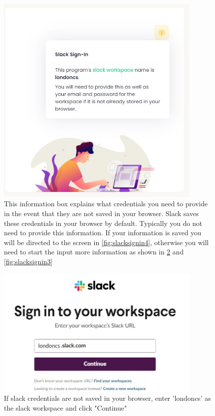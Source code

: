 \begin{figure}[H]
    \centering
    \includegraphics[width=10cm]{images/user-guide/slack-sign-in/1a.jpg}
    \caption{This information box explains what credentials you need to provide in the event that they are not saved in your browser. Slack saves these credentials in your browser by default. Typically you do not need to provide this information. If your information is saved you will be directed to the screen in \cref{fig:slacksignin4}, otherwise you will need to start the input more information as shown in \cref{fig:slacksignin2} and \cref{fig:slacksignin3}}
    \label{fig:slacksignin1a}
\end{figure}
\begin{figure}[H]
    \centering
    \includegraphics[width=10cm]{images/user-guide/slack-sign-in/2.jpg}
    \caption{If slack credentials are not saved in your browser, enter 'londoncs' as the slack workspace and click "Continue"}
    \label{fig:slacksignin2}
\end{figure}
